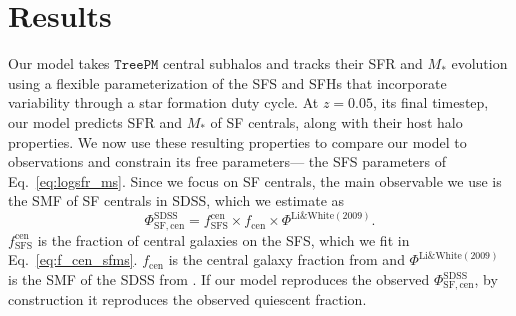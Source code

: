 \documentclass[12pt, letterpaper, preprint, tighten]{aastex62}
\newcommand{\beq}{\begin{equation}}
\newcommand{\eeq}{\end{equation}}
\begin{document}
\section{Results} \label{sec:results} 
Our model takes $\mathtt{TreePM}$ central subhalos and tracks their SFR 
and $M_*$ evolution using a flexible parameterization of the SFS and 
SFHs that incorporate variability through a star formation duty cycle.
At $z = 0.05$, its final timestep, our model predicts SFR and $M_*$ of SF 
centrals, along with their host halo properties. We now use these resulting properties to compare our 
model to observations and constrain its free parameters--- the 
SFS parameters of Eq.~\ref{eq:logsfr_ms}. Since we focus on SF centrals, 
the main observable we use is the SMF of SF centrals in SDSS, which we estimate as 
\beq \label{eq:smf_sf_cen} 
\Phi^\mathrm{SDSS}_\mathrm{SF,cen} = f^\mathrm{cen}_\mathrm{SFS} \times f_\mathrm{cen} \times \Phi^\mathrm{Li\&White(2009)}.
\eeq
$f^\mathrm{cen}_\mathrm{SFS}$ is the fraction of central galaxies on the 
SFS, which we fit in Eq.~\ref{eq:f_cen_sfms}. $f_\mathrm{cen}$ is the 
central galaxy fraction from \cite{wetzel2013} and $\Phi^\mathrm{Li\&White(2009)}$ 
is the SMF of the SDSS from \cite{li2009}. If our model reproduces the 
observed $\Phi^\mathrm{SDSS}_\mathrm{SF,cen}$, by construction it reproduces 
the observed quiescent fraction. 
\end{document}
